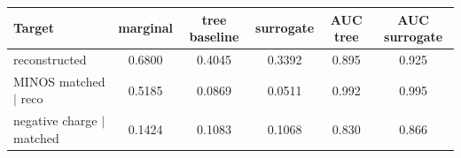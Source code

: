 \begin{tabular}{lccccc}
\toprule
Target & marginal & tree baseline & surrogate & AUC tree & AUC surrogate \\
\midrule
reconstructed & 0.6800 & 0.4045 & 0.3392 & 0.895 & 0.925 \\
MINOS matched $\mid$ reco & 0.5185 & 0.0869 & 0.0511 & 0.992 & 0.995 \\
negative charge $\mid$ matched & 0.1424 & 0.1083 & 0.1068 & 0.830 & 0.866 \\
\bottomrule
\end{tabular}
